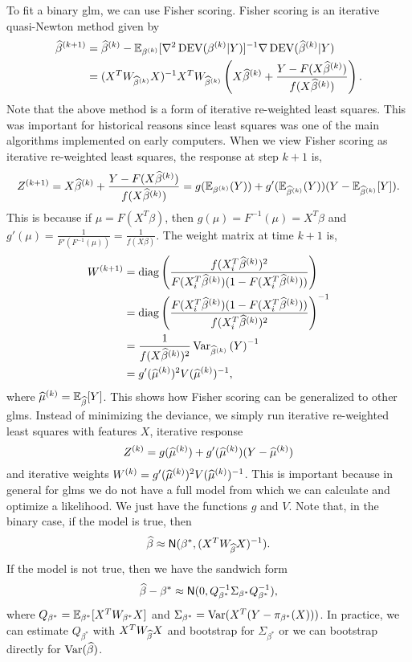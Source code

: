 To fit a binary glm, we can use Fisher scoring. Fisher scoring is an iterative quasi-Newton method given by{
\begin{align*}
    \widehat{\beta}^{(k+1)}& = \widehat{\beta}^{(k)} - {\mathbb{E}}_{\beta^{(k)}}[\nabla^2 \operatorname{DEV}(\beta^{(k)}|Y)]^{-1}\nabla \operatorname{DEV}(\widehat{\beta}^{(k)}|Y) \\
    &= (X^TW_{\widehat{\beta}^{(k)}}X)^{-1}X^TW_{\widehat{\beta}^{(k)}}\left(X\widehat{\beta}^{(k)}+\frac{Y-F(X\widehat{\beta}^{(k)})}{f(X\widehat{\beta}^{(k)})}\right).
\end{align*}
Note that the above method is a form of iterative re-weighted least squares. This was important for historical reasons since least squares was one of the main algorithms implemented on early computers. When we view Fisher scoring as iterative re-weighted least squares, the response at step $k+1$ is,
\[Z^{(k+1)} = X\widehat{\beta}^{(k)} + \frac{Y-F(X\widehat{\beta}^{(k)})}{f(X\widehat{\beta}^{(k)})} = g({\mathbb{E}}_{\beta^{(k)}}(Y)) + g'({\mathbb{E}}_{\widehat{\beta}^{(k)}}(Y))(Y-{\mathbb{E}}_{\widehat{\beta}^{(k)}}[Y]). \]
This is because if $\mu = F(X^T\beta)$, then $g(\mu) = F^{-1}(\mu) = X^T\beta$ and $g'(\mu) = \frac{1}{F'(F^{-1}(\mu))} = \frac{1}{f(X\beta)}$. The weight matrix at time $k+1$ is,
\begin{align*}
    W^{(k+1)} &= \operatorname{diag}\left(\frac{f(X_i^T\widehat{\beta}^{(k)})^2}{F(X_i^T\widehat{\beta}^{(k)})(1-F(X_i^T\widehat{\beta}^{(k)}))}\right)\\
    &=\operatorname{diag}\left(\frac{F(X_i^T\widehat{\beta}^{(k)})(1-F(X_i^T\widehat{\beta}^{(k)}))}{f(X_i^T\widehat{\beta}^{(k)})^2}\right)^{-1}\\
    &=\frac{1}{f(X\widehat{\beta}^{(k)})^2}\operatorname{Var}_{\widehat{\beta}^{(k)}}\left(Y\right)^{-1}\\
    &=g'(\widehat{\mu}^{(k)})^2 V(\widehat{\mu}^{(k)})^{-1},
\end{align*}
where $\widehat{\mu}^{(k)} = {\mathbb{E}}_{\widehat{\beta}}[Y]$. This shows how Fisher scoring can be generalized to other glms. Instead of minimizing the deviance, we simply run iterative re-weighted least squares with features $X$, iterative response \[Z^{(k)} = g(\widehat{\mu}^{(k)})+g'(\widehat{\mu}^{(k)})(Y-\widehat{\mu}^{(k)})\] and iterative weights $W^{(k)} = g'(\widehat{\mu}^{(k)})^2V(\widehat{\mu}^{(k)})^{-1}$. This is important because in general for glms we do not have a full model from which we can calculate and optimize a likelihood. We just have the functions $g$ and $V$. Note that, in the binary case, if the model is true, then 
\[\widehat{\beta} \approx \mathsf{N}(\beta^*, (X^TW_{\widehat{\beta}}X)^{-1}). \]
If the model is not true, then we have the sandwich form
\[\widehat{\beta}-\beta^* \approx \mathsf{N}(0, Q^{-1}_{\beta^*}\Sigma_{\beta^*}Q^{-1}_{\beta^*}), \]
where $Q_{\beta^*} = {\mathbb{E}}_{\beta^*}[X^TW_{\beta^*}X]$ and $\Sigma_{\beta^*} = \operatorname{Var}(X^T(Y-\pi_{\beta^*}(X)))$. In practice, we can estimate $Q_{\beta^*}$ with $X^TW_{\widehat{\beta}}X$ and bootstrap for $\Sigma_{\beta^*}$ or we can bootstrap directly for $\operatorname{Var}(\widehat{\beta})$. 
}
